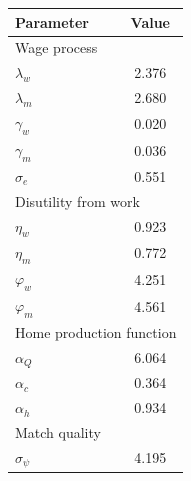 \begin{tabular}{lc} \toprule
Parameter & Value \\ \midrule 
\multicolumn{2}{l}{Wage process} \\ 
$\lambda_w$ & 2.376 \\ 
$\lambda_m$ & 2.680 \\ 
$\gamma_w$ & 0.020 \\ 
$\gamma_m$ & 0.036 \\ 
$\sigma_e$ & 0.551 \\ 
\multicolumn{2}{l}{Disutility from work} \\ 
$\eta_w$ & 0.923 \\ 
$\eta_m$ & 0.772 \\ 
$\varphi_w$ & 4.251 \\ 
$\varphi_m$ & 4.561 \\ 
\multicolumn{2}{l}{Home production function} \\ 
$\alpha_Q$ & 6.064 \\ 
$\alpha_c$ & 0.364 \\ 
$\alpha_h$ & 0.934 \\ 
\multicolumn{2}{l}{Match quality} \\ 
$\sigma_\psi$ & 4.195 \\ 
\bottomrule \end{tabular}
